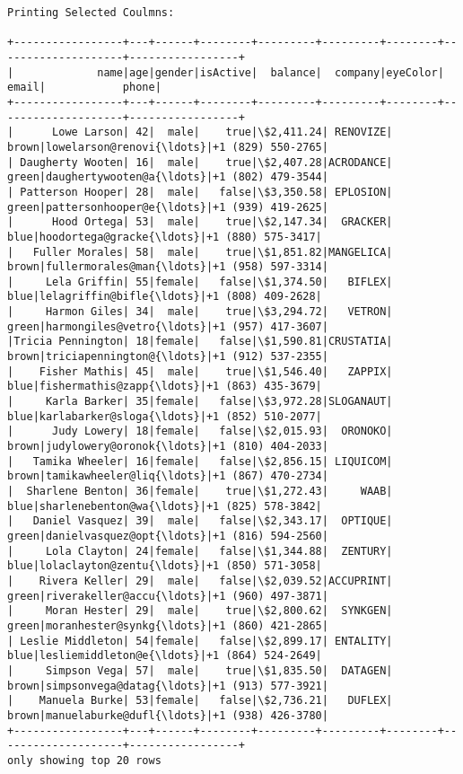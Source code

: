 \documentclass[11pt]{article}
\begin{document}
    \begin{Verbatim}[commandchars=\\\{\}]
Printing Selected Coulmns: 

+-----------------+---+------+--------+---------+---------+--------+--------------------+-----------------+
|             name|age|gender|isActive|  balance|  company|eyeColor|               email|            phone|
+-----------------+---+------+--------+---------+---------+--------+--------------------+-----------------+
|      Lowe Larson| 42|  male|    true|\$2,411.24| RENOVIZE|   brown|lowelarson@renovi{\ldots}|+1 (829) 550-2765|
| Daugherty Wooten| 16|  male|    true|\$2,407.28|ACRODANCE|   green|daughertywooten@a{\ldots}|+1 (802) 479-3544|
| Patterson Hooper| 28|  male|   false|\$3,350.58| EPLOSION|   green|pattersonhooper@e{\ldots}|+1 (939) 419-2625|
|      Hood Ortega| 53|  male|    true|\$2,147.34|  GRACKER|    blue|hoodortega@gracke{\ldots}|+1 (880) 575-3417|
|   Fuller Morales| 58|  male|    true|\$1,851.82|MANGELICA|   brown|fullermorales@man{\ldots}|+1 (958) 597-3314|
|     Lela Griffin| 55|female|   false|\$1,374.50|   BIFLEX|    blue|lelagriffin@bifle{\ldots}|+1 (808) 409-2628|
|     Harmon Giles| 34|  male|    true|\$3,294.72|   VETRON|   green|harmongiles@vetro{\ldots}|+1 (957) 417-3607|
|Tricia Pennington| 18|female|   false|\$1,590.81|CRUSTATIA|   brown|triciapennington@{\ldots}|+1 (912) 537-2355|
|    Fisher Mathis| 45|  male|    true|\$1,546.40|   ZAPPIX|    blue|fishermathis@zapp{\ldots}|+1 (863) 435-3679|
|     Karla Barker| 35|female|   false|\$3,972.28|SLOGANAUT|    blue|karlabarker@sloga{\ldots}|+1 (852) 510-2077|
|      Judy Lowery| 18|female|   false|\$2,015.93|  ORONOKO|   brown|judylowery@oronok{\ldots}|+1 (810) 404-2033|
|   Tamika Wheeler| 16|female|   false|\$2,856.15| LIQUICOM|   brown|tamikawheeler@liq{\ldots}|+1 (867) 470-2734|
|  Sharlene Benton| 36|female|    true|\$1,272.43|     WAAB|    blue|sharlenebenton@wa{\ldots}|+1 (825) 578-3842|
|   Daniel Vasquez| 39|  male|   false|\$2,343.17|  OPTIQUE|   green|danielvasquez@opt{\ldots}|+1 (816) 594-2560|
|     Lola Clayton| 24|female|   false|\$1,344.88|  ZENTURY|    blue|lolaclayton@zentu{\ldots}|+1 (850) 571-3058|
|    Rivera Keller| 29|  male|   false|\$2,039.52|ACCUPRINT|   green|riverakeller@accu{\ldots}|+1 (960) 497-3871|
|     Moran Hester| 29|  male|    true|\$2,800.62|  SYNKGEN|   green|moranhester@synkg{\ldots}|+1 (860) 421-2865|
| Leslie Middleton| 54|female|   false|\$2,899.17| ENTALITY|    blue|lesliemiddleton@e{\ldots}|+1 (864) 524-2649|
|     Simpson Vega| 57|  male|    true|\$1,835.50|  DATAGEN|   brown|simpsonvega@datag{\ldots}|+1 (913) 577-3921|
|    Manuela Burke| 53|female|   false|\$2,736.21|   DUFLEX|   brown|manuelaburke@dufl{\ldots}|+1 (938) 426-3780|
+-----------------+---+------+--------+---------+---------+--------+--------------------+-----------------+
only showing top 20 rows


    \end{Verbatim}
\end{document}
